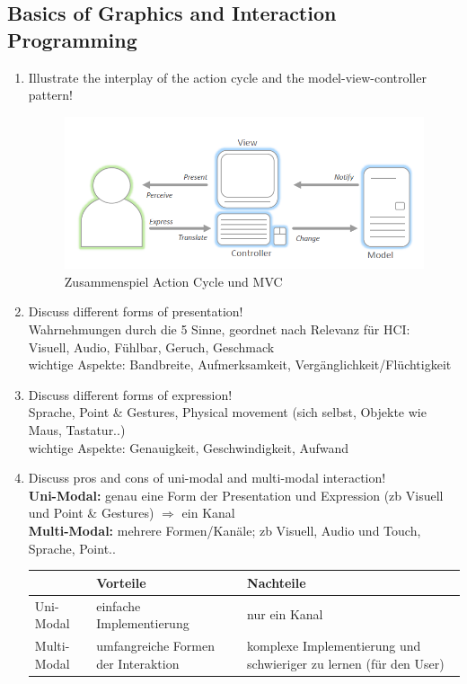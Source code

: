 \subsection{Basics of Graphics and Interaction Programming}
\begin{enumerate}
	\item Illustrate the interplay of the action cycle and the model-view-controller pattern!
	\begin{figure}[!h]
		\centering
		\includegraphics[scale=0.5]{img/ac_with_mvc.png}
		\caption{Zusammenspiel Action Cycle und MVC}
	\end{figure}
	
	\item Discuss different forms of presentation!\\
	Wahrnehmungen durch die 5 Sinne, geordnet nach Relevanz für HCI:\\
	Visuell, Audio, Fühlbar, Geruch, Geschmack\\
	wichtige Aspekte: Bandbreite, Aufmerksamkeit, Vergänglichkeit/Flüchtigkeit
	
	\item Discuss different forms of expression!\\
	Sprache, Point \& Gestures, Physical movement (sich selbst, Objekte wie Maus, Tastatur..)\\
	wichtige Aspekte: Genauigkeit, Geschwindigkeit, Aufwand
	
	\item Discuss pros and cons of uni-modal and multi-modal interaction!\\
	\textbf{Uni-Modal:} genau eine Form der Presentation und Expression (zb Visuell und Point \& Gestures) $\Rightarrow$ ein Kanal\\
	\textbf{Multi-Modal:} mehrere Formen/Kanäle; zb Visuell, Audio und Touch, Sprache, Point..
	\begin{table}[!h]
		\centering
		\begin{tabular}{|l|p{15em}|p{15em}|}
			\hline
			&	\textbf{Vorteile} & \textbf{Nachteile}\\
			\hline
			Uni-Modal & einfache Implementierung & nur ein Kanal\\
			\hline
			Multi-Modal & umfangreiche Formen der Interaktion & komplexe Implementierung und schwieriger zu lernen (für den User)\\
			\hline
		\end{tabular}
	\end{table}
	

\end{enumerate}
